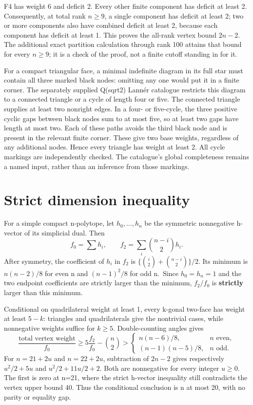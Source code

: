 \documentclass[
  10pt,
]{report}
\begin{document}
F4 has weight 6 and deficit 2. Every other finite component has deficit
at least 2. Consequently, at total rank \(n\ge9\), a single component
has deficit at least 2; two or more components also have combined
deficit at least 2, because each component has deficit at least 1. This
proves the all-rank vertex bound \(2n-2\). The additional exact
partition calculation through rank 100 attains that bound for every
\(n\ge9\); it is a check of the proof, not a finite cutoff standing in
for it.

For a compact triangular face, a minimal indefinite diagram in its full
star must contain all three marked black nodes: omitting any one would
put it in a finite corner. The separately supplied Q(sqrt2) Lannér
catalogue restricts this diagram to a connected triangle or a cycle of
length four or five. The connected triangle supplies at least two
nonright edges. In a four- or five-cycle, the three positive cyclic gaps
between black nodes sum to at most five, so at least two gaps have
length at most two. Each of these paths avoids the third black node and
is present in the relevant finite corner. These give two base weights,
regardless of any additional nodes. Hence every triangle has weight at
least 2. All cycle markings are independently checked. The catalogue's
global completeness remains a named input, rather than an inference from
those markings.

\section{Strict dimension inequality}\label{strict-dimension-inequality}

For a simple compact n-polytope, let \(h_0,\ldots,h_n\) be the symmetric
nonnegative h-vector of its simplicial dual. Then \[
f_0=\sum h_i,\qquad
f_2=\sum_i\binom{n-i}{2}h_i.
\] After symmetry, the coefficient of \(h_i\) in \(f_2\) is
\(\{\binom i2+\binom{n-i}2\}/2\). Its minimum is \(n(n-2)/8\) for even n
and \((n-1)^2/8\) for odd n.~Since \(h_0=h_n=1\) and the two endpoint
coefficients are strictly larger than the minimum, \(f_2/f_0\) is
\textbf{strictly} larger than this minimum.

Conditional on quadrilateral weight at least 1, every k-gonal two-face
has weight at least \(5-k\): triangles and quadrilaterals give the
nontrivial cases, while nonnegative weights suffice for \(k\ge5\).
Double-counting angles gives \[
\frac{\text{total vertex weight}}{f_0}
\ge5\frac{f_2}{f_0}-\binom n2
>
\begin{cases}n(n-6)/8,&n\text{ even},\\
(n-1)(n-5)/8,&n\text{ odd}.
\end{cases}
\] For \(n=21+2u\) and \(n=22+2u\), subtraction of \(2n-2\) gives
respectively \(u^2/2+5u\) and \(u^2/2+11u/2+2\). Both are nonnegative
for every integer \(u\ge0\). The first is zero at n=21, where the strict
h-vector inequality still contradicts the vertex upper bound 40. Thus
the conditional conclusion is n at most 20, with no parity or equality
gap.
\end{document}
